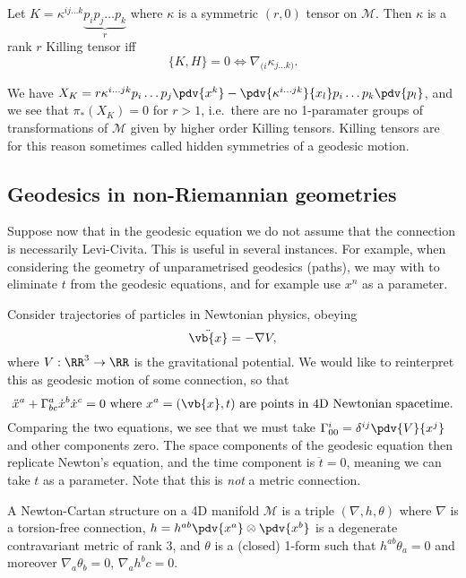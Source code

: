 \documentclass{jknotes}
\begin{document}
\begin{defn}
    Let \(K = \kappa^{ij\dots k}\underbrace{p_ip_j\dots p_k}_r\) where \(\kappa\) is a symmetric \((r,0)\) tensor on \(\mathcal{M}\). Then \(\kappa\) is a rank \(r\) Killing tensor iff
    \begin{equation}
        \{K,H\}=0 \iff \nabla_{(i}\kappa_{j\dots k)}.
    \end{equation}
\end{defn}

We have \(X_K=r\kappa^{i\dots jk}p_i\dots p_j\pdv{x^k} - \pdv{\kappa^{i\dots jk}}{x_l}p_i\dots p_k\pdv{p_l}\), and we see that \(\pi_*(X_K) = 0\) for \(r>1\), i.e.\ there are no 1-paramater groups of transformations of \(\mathcal{M}\) given by higher order Killing tensors. Killing tensors are for this reason sometimes called hidden symmetries of a geodesic motion.

\subsection{Geodesics in non-Riemannian geometries}
Suppose now that in the geodesic equation we do not assume that the connection is necessarily Levi-Civita. This is useful in several instances. For example, when considering the geometry of unparametrised geodesics (paths), we may with to eliminate \(t\) from the geodesic equations, and for example use \(x^n\) as a parameter. 

Consider trajectories of particles in Newtonian physics, obeying
\begin{equation}
    \ddot{\vb{x}} = -\nabla V,
\end{equation}
where \(V:\RR^3\to\RR\) is the gravitational potential. We would like to reinterpret this as geodesic motion of some connection, so that
\begin{equation}
    \ddot{x}^a + \Gamma^a_{bc}\dot{x}^b\dot{x}^c=0 \text{ where \(x^a=(\vb{x},t)\) are points in 4D Newtonian spacetime.}
\end{equation}
Comparing the two equations, we see that we must take \(\Gamma^i_{00}=\delta^{ij}\pdv{V}{x^j}\) and other components zero. The space components of the geodesic equation then replicate Newton's equation, and the time component is \(\ddot{t}=0\), meaning we can take \(t\) as a parameter. Note that this is \emph{not} a metric connection.

\begin{defn}
    A Newton-Cartan structure on a 4D manifold \(\mathcal{M}\) is a triple \((\nabla,h,\theta)\) where \(\nabla\) is a torsion-free connection, \(h=h^{ab}\pdv{x^a}\otimes\pdv{x^b}\) is a degenerate contravariant metric of rank 3, and \(\theta\) is a (closed) 1-form such that \(h^{ab}\theta_a=0\) and moreover \(\nabla_a\theta_b=0\), \(\nabla_ah^bc=0\).
\end{defn}
\end{document}
